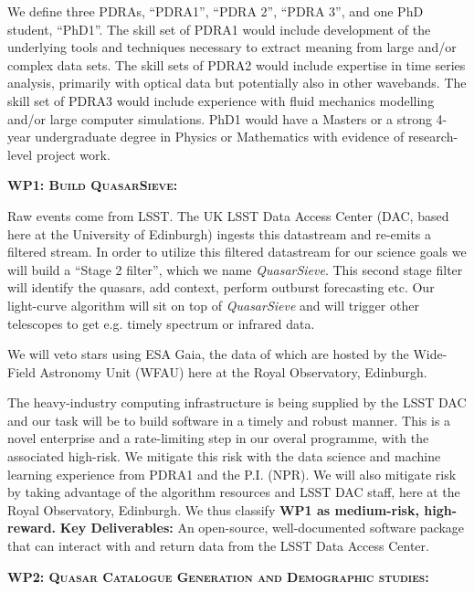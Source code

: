 \smallskip
\smallskip
\noindent
We define three PDRAs, ``PDRA1'', ``PDRA 2'', ``PDRA 3'', and one PhD
student, ``PhD1''.  The skill set of PDRA1 would include development
of the underlying tools and techniques necessary to extract meaning
from large and/or complex data sets.  The skill sets of PDRA2 would
include expertise in time series analysis, primarily with optical
data but potentially also in other wavebands.  The skill set of PDRA3
would include experience with fluid mechanics modelling and/or large
computer simulations.  PhD1 would have a Masters or a strong 4-year
undergraduate degree in Physics or Mathematics with evidence of
research-level project work.

\medskip \medskip
\smallskip
\smallskip
\noindent
\textbf{\textsc{WP1: Build QuasarSieve:}} 

\smallskip
\smallskip
\noindent
Raw events come from LSST. The UK LSST Data Access Center (DAC, based
here at the University of Edinburgh) ingests this datastream and
re-emits a filtered stream. In order to utilize this filtered
datastream for our science goals we will build a ``Stage 2 filter'',
which we name {\it QuasarSieve}.  This second stage filter will
identify the quasars, add context, perform outburst forecasting etc.
Our light-curve algorithm will sit on top of {\it QuasarSieve} and
will trigger other telescopes to get e.g. timely spectrum or infrared
data.

\smallskip
\smallskip
\noindent
We will veto stars using ESA Gaia, the data of which are hosted by the
Wide-Field Astronomy Unit (WFAU) here at the Royal Observatory,
Edinburgh.

\smallskip
\smallskip
\noindent
The heavy-industry computing infrastructure is being supplied by the
LSST DAC and our task will be to build software in a timely and robust
manner.  This is a novel enterprise and a rate-limiting step in our
overal programme, with the associated high-risk.  We mitigate this
risk with the data science and machine learning experience from PDRA1
and the P.I. (NPR).  We will also mitigate risk by taking advantage of
the algorithm resources and LSST DAC staff, here at the Royal
Observatory, Edinburgh.  We thus classify {\bf WP1 as medium-risk,
high-reward.}  {\bf Key Deliverables:} An open-source, well-documented
software package that can interact with and return data from the LSST
Data Access Center.



\medskip 
\medskip
\smallskip
\smallskip
\noindent
\textbf{\textsc{WP2: Quasar Catalogue Generation and Demographic studies:}}  

